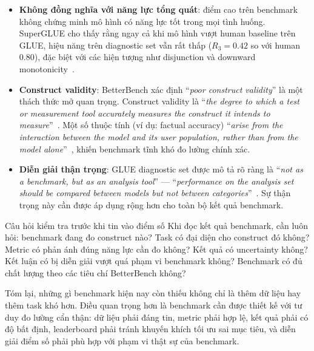 \begin{itemize}
    \item \textbf{Không đồng nghĩa với năng lực tổng quát}: điểm cao trên benchmark không chứng minh mô hình có năng lực tốt trong mọi tình huống. SuperGLUE cho thấy rằng ngay cả khi mô hình vượt human baseline trên GLUE, hiệu năng trên diagnostic set vẫn rất thấp ($R_3 = 0.42$ so với human 0.80), đặc biệt với các hiện tượng như disjunction và downward monotonicity~\cite{superglue}.

    \item \textbf{Construct validity}: BetterBench xác định ``\textit{poor construct validity}'' là một thách thức mở quan trọng. Construct validity là ``\textit{the degree to which a test or measurement tool accurately measures the construct it intends to measure}''~\cite{betterbench}. Một số thuộc tính (ví dụ: factual accuracy) ``\textit{arise from the interaction between the model and its user population, rather than from the model alone}''~\cite{betterbench}, khiến benchmark tĩnh khó đo lường chính xác.

    \item \textbf{Diễn giải thận trọng}: GLUE diagnostic set được mô tả rõ ràng là ``\textit{not as a benchmark, but as an analysis tool}'' --- ``\textit{performance on the analysis set should be compared between models but not between categories}''~\cite{glue}. Sự thận trọng này cần được áp dụng rộng hơn cho toàn bộ kết quả benchmark.
\end{itemize}

\begin{summarybox}{Câu hỏi kiểm tra trước khi tin vào điểm số}
Khi đọc kết quả benchmark, cần luôn hỏi: benchmark đang đo construct nào? Task có đại diện cho construct đó không? Metric có phản ánh đúng năng lực cần đo không? Kết quả có uncertainty không? Kết luận có bị diễn giải vượt quá phạm vi benchmark không? Benchmark có đủ chất lượng theo các tiêu chí BetterBench không?
\end{summarybox}

Tóm lại, những gì benchmark hiện nay còn thiếu không chỉ là thêm dữ liệu hay thêm task khó hơn. Điều quan trọng hơn là benchmark cần được thiết kế với tư duy đo lường cẩn thận: dữ liệu phải đáng tin, metric phải hợp lệ, kết quả phải có độ bất định, leaderboard phải tránh khuyến khích tối ưu sai mục tiêu, và diễn giải điểm số phải phù hợp với phạm vi thật sự của benchmark.